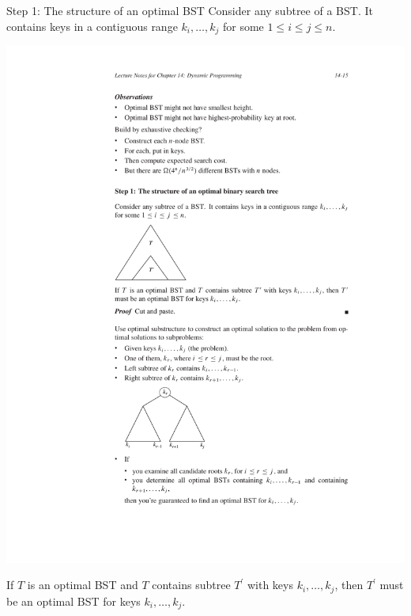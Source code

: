 \documentclass[aspectratio=169]{beamer}
\begin{document}
\begin{frame}{Step 1: The structure of an optimal BST}
    Consider any subtree of a BST.  It contains keys in a contiguous range $k_i, \ldots, k_j$ for some $1 \leq i \leq j \leq n$.

    \includegraphics[width=\textwidth, trim={4cm 15cm 4cm 9.5cm}, clip]{figures/BST_step1}

    If $T$ is an optimal BST and $T$ contains subtree $T^\prime$ with keys $k_i, \ldots, k_j$, then $T^\prime$ must be an optimal BST for keys $k_i, \ldots, k_j$.
\end{frame}
\end{document}
